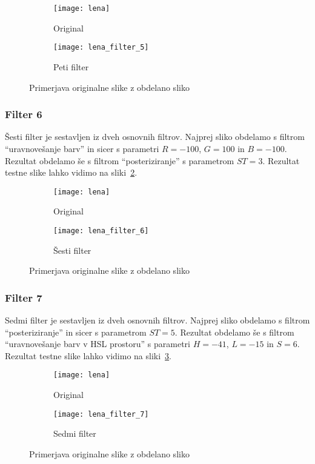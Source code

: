 \begin{figure}[!ht]
    \centering
    \begin{subfigure}[b]{0.4\textwidth}
        \texttt{[image: lena]}
        \caption{Original}
    \end{subfigure}
    \begin{subfigure}[b]{0.4\textwidth}
        \texttt{[image: lena\_filter\_5]}
        \caption{Peti filter}
    \end{subfigure}
    \caption{Primerjava originalne slike z obdelano sliko}
    \label{fig:lena_filter_5}
\end{figure}


\subsubsection*{Filter 6}
Šesti filter je sestavljen iz dveh osnovnih filtrov. Najprej sliko obdelamo s
filtrom ``uravnovešanje barv'' in sicer s parametri $R = -100$, $G = 100$ in
$B = -100$. Rezultat obdelamo še s filtrom ``posteriziranje'' s parametrom
$ST = 3$. Rezultat testne slike lahko vidimo na sliki~\ref{fig:lena_filter_6}.

\begin{figure}[!ht]
    \centering
    \begin{subfigure}[b]{0.4\textwidth}
        \texttt{[image: lena]}
        \caption{Original}
    \end{subfigure}
    \begin{subfigure}[b]{0.4\textwidth}
        \texttt{[image: lena\_filter\_6]}
        \caption{Šesti filter}
    \end{subfigure}
    \caption{Primerjava originalne slike z obdelano sliko}
    \label{fig:lena_filter_6}
\end{figure}


\subsubsection*{Filter 7}
Sedmi filter je sestavljen iz dveh osnovnih filtrov. Najprej sliko obdelamo s
filtrom ``posteriziranje'' in sicer s parametrom $ST = 5$. Rezultat obdelamo
še s filtrom ``uravnovešanje barv v HSL prostoru'' s parametri $H = -41$,
$L = -15$ in $S = 6$. Rezultat testne slike lahko vidimo na
sliki~\ref{fig:lena_filter_7}.

\begin{figure}[!ht]
    \centering
    \begin{subfigure}[b]{0.4\textwidth}
        \texttt{[image: lena]}
        \caption{Original}
    \end{subfigure}
    \begin{subfigure}[b]{0.4\textwidth}
        \texttt{[image: lena\_filter\_7]}
        \caption{Sedmi filter}
    \end{subfigure}
    \caption{Primerjava originalne slike z obdelano sliko}
    \label{fig:lena_filter_7}
\end{figure}


